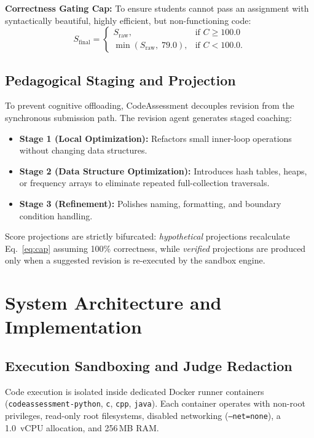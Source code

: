 \documentclass[conference]{IEEEtran}
\begin{document}
\textbf{Correctness Gating Cap:} To ensure students cannot pass an assignment with syntactically beautiful, highly efficient, but non-functioning code:
\begin{equation}
S_{\text{final}} = \begin{cases}
S_{\text{raw}}, & \text{if } C \ge 100.0 \\
\min(S_{\text{raw}}, \; 79.0), & \text{if } C < 100.0.
\end{cases}
\label{eq:cap}
\end{equation}

\subsection{Pedagogical Staging and Projection}
To prevent cognitive offloading, CodeAssessment decouples revision from the synchronous submission path. The revision agent generates staged coaching:
\begin{itemize}
    \item \textbf{Stage 1 (Local Optimization):} Refactors small inner-loop operations without changing data structures.
    \item \textbf{Stage 2 (Data Structure Optimization):} Introduces hash tables, heaps, or frequency arrays to eliminate repeated full-collection traversals.
    \item \textbf{Stage 3 (Refinement):} Polishes naming, formatting, and boundary condition handling.
\end{itemize}
Score projections are strictly bifurcated: \textit{hypothetical} projections recalculate Eq.~\eqref{eq:cap} assuming 100\% correctness, while \textit{verified} projections are produced only when a suggested revision is re-executed by the sandbox engine.

\section{System Architecture and Implementation}

\subsection{Execution Sandboxing and Judge Redaction}
Code execution is isolated inside dedicated Docker runner containers (\texttt{codeassessment-python}, \texttt{c}, \texttt{cpp}, \texttt{java}). Each container operates with non-root privileges, read-only root filesystems, disabled networking (\texttt{--net=none}), a 1.0~vCPU allocation, and 256\,MB RAM. 
\end{document}
